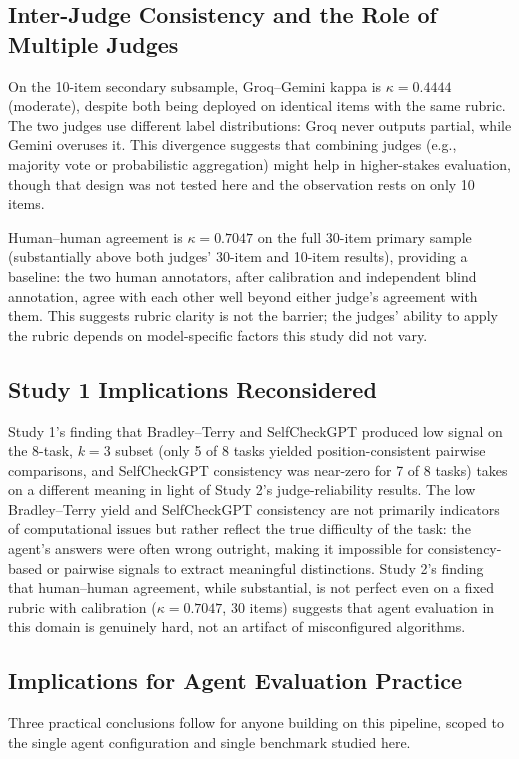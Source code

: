 \documentclass[conference]{IEEEtran}
\begin{document}
\subsection{Inter-Judge Consistency and the Role of Multiple Judges}
On the 10-item secondary subsample, Groq--Gemini kappa is $\kappa=0.4444$ (moderate), despite both being deployed on identical items with the same rubric. The two judges use different label distributions: Groq never outputs partial, while Gemini overuses it. This divergence suggests that combining judges (e.g., majority vote or probabilistic aggregation) might help in higher-stakes evaluation, though that design was not tested here and the observation rests on only 10 items.

Human--human agreement is $\kappa=0.7047$ on the full 30-item primary sample (substantially above both judges' 30-item and 10-item results), providing a baseline: the two human annotators, after calibration and independent blind annotation, agree with each other well beyond either judge's agreement with them. This suggests rubric clarity is not the barrier; the judges' ability to apply the rubric depends on model-specific factors this study did not vary.

\subsection{Study 1 Implications Reconsidered}
Study 1's finding that Bradley--Terry and SelfCheckGPT produced low signal on the 8-task, $k=3$ subset (only 5 of 8 tasks yielded position-consistent pairwise comparisons, and SelfCheckGPT consistency was near-zero for 7 of 8 tasks) takes on a different meaning in light of Study 2's judge-reliability results. The low Bradley--Terry yield and SelfCheckGPT consistency are not primarily indicators of computational issues but rather reflect the true difficulty of the task: the agent's answers were often wrong outright, making it impossible for consistency-based or pairwise signals to extract meaningful distinctions. Study 2's finding that human--human agreement, while substantial, is not perfect even on a fixed rubric with calibration ($\kappa=0.7047$, 30 items) suggests that agent evaluation in this domain is genuinely hard, not an artifact of misconfigured algorithms.

\subsection{Implications for Agent Evaluation Practice}
Three practical conclusions follow for anyone building on this pipeline, scoped to the single agent configuration and single benchmark studied here.
\end{document}
